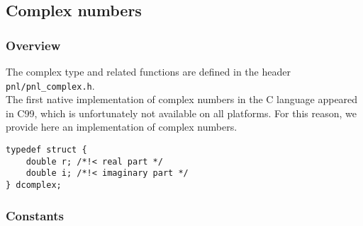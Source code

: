 
\subsection{Complex numbers}
\subsubsection{Overview}

The complex type and related functions are defined in the header
\verb!pnl/pnl_complex.h!.\\

The first native implementation of complex numbers in the C language appeared in
C99, which is unfortunately not available on all platforms. For this reason, we
provide here an implementation of complex numbers.

\label{dcomplex}
\begin{lstlisting}
typedef struct {
    double r; /*!< real part */
    double i; /*!< imaginary part */
} dcomplex;
\end{lstlisting}


\subsubsection{Constants}

\begin{describeconst}
\end{describeconst}

